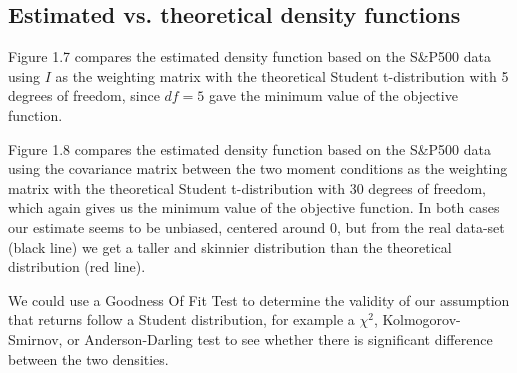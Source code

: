 \subsection{Estimated vs. theoretical density functions}
Figure 1.7 compares the estimated density function based on the S\&P500 data using $I$ as the weighting matrix with the theoretical Student t-distribution with 5 degrees of freedom, since $df=5$ gave the minimum value of the objective function.
\smallskip\par
Figure 1.8 compares the estimated density function based on the S\&P500 data using the covariance matrix between the two moment conditions as the weighting matrix with the theoretical Student t-distribution with 30 degrees of freedom, which again gives us the minimum value of the objective function. In both cases our estimate seems to be unbiased, centered around 0, but from the real data-set (black line) we get a taller and skinnier distribution than the theoretical distribution (red line).
\smallskip\par 
We could use a Goodness Of Fit Test to determine the validity of our assumption that returns follow a Student distribution, for example a $\chi^2$, Kolmogorov-Smirnov, or Anderson-Darling test to see whether there is significant difference between the two densities.




